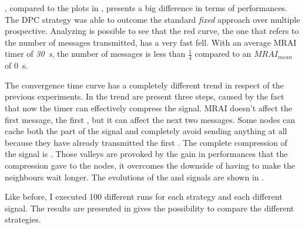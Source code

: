, compared to the plots in
,
presents a big difference in terms of performances.
The \ac{DPC} strategy was able to outcome the standard \textit{fixed} approach
over multiple prospective.
Analyzing  is possible to see that
the red curve, the one that refers to the number of messages transmitted, has
a very fast fell.
With an average \ac{MRAI} timer of \textit{\SI{30}{\second}},
the number of messages is less than \(\frac{1}{4}\) compared to an \(MRAI_{mean}\)
of \SI{0}{\second}.

The convergence time curve has a completely different trend in respect of the
previous experiments.
In the trend are present three steps, caused by the fact that
now the timer can effectively compress the signal.
\ac{MRAI} doesn't affect the first message, the first , but
it can affect the next two messages.
Some nodes can cache both the  part of the signal and
completely avoid sending anything at all because they have already transmitted
the first .
The complete compression of the signal  is .
Those valleys are provoked by the gain in performances that the compression gave
to the nodes, it overcomes the downside of having to make the neighbours wait longer.
The evolutions of the  and  signals are shown in
.

Like before, I executed \num{100} different runs for each strategy and each
different signal.
The results are presented in 
gives the possibility to compare the different strategies.

